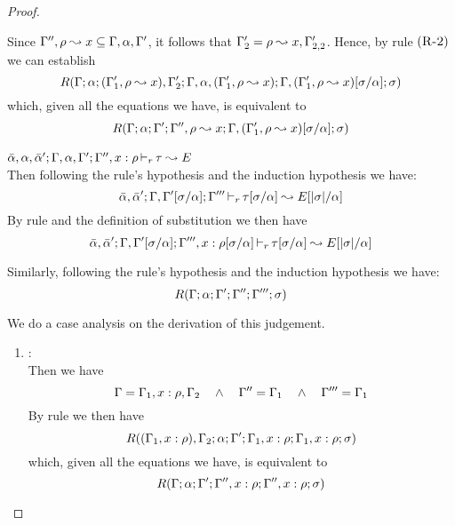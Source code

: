 \begin{proof}
\begin{description}
\begin{enumerate}
  Since $\Gamma'',\rho \leadsto x \subseteq \Gamma,\alpha,\Gamma'$, it follows that $\Gamma_2' = \rho\leadsto x,\Gamma_{2,2}'$.
  Hence, by rule $\mbox{({\tt\sc R-2})}$ we can establish
\begin{equation*}
R(\Gamma;\alpha;(\Gamma_1',\rho\leadsto x),\Gamma_2';\Gamma,\alpha,(\Gamma_1',\rho \leadsto x);\Gamma,(\Gamma_1',\rho\leadsto x)[\sigma/\alpha];\sigma)
\end{equation*}
        which, given all the equations we have, is equivalent to
\begin{equation*}
R(\Gamma;\alpha;\Gamma';\Gamma'',\rho\leadsto x;\Gamma,(\Gamma_1',\rho \leadsto x)[\sigma/\alpha];\sigma)
\end{equation*}
  \end{enumerate}
\item[\fbox{\texttt{(L-Var)}}]\quad$\bar{\alpha},\alpha,\bar{\alpha}';\Gamma,\alpha,\Gamma';\Gamma'', x : \rho  \mathop{\vdash_{r}} \tau \leadsto E$ \ \\
  Then following the rule's hypothesis and the induction hypothesis we have:
\begin{equation*}
  \bar{\alpha},\bar{\alpha}';\Gamma,\Gamma'[\sigma/\alpha];\Gamma''' \mathop{\vdash_{r}} \tau[\sigma/\alpha] \leadsto E[|\sigma|/\alpha]
\end{equation*}
  By rule  and the definition of substitution we then have
\begin{equation*}
  \bar{\alpha},\bar{\alpha}';\Gamma,\Gamma'[\sigma/\alpha];\Gamma''',x:\rho[\sigma/\alpha] \mathop{\vdash_{r}} \tau[\sigma/\alpha] \leadsto E[|\sigma|/\alpha]
\end{equation*}

  Similarly, following the rule's hypothesis and the induction hypothesis we have:
\begin{equation*}
  R(\Gamma;\alpha;\Gamma';\Gamma'';\Gamma''';\sigma)
\end{equation*}

  We do a case analysis on the derivation of this judgement.
  \begin{enumerate}
  \item {}: \\ Then we have
\begin{equation*}
  \Gamma = \Gamma_1,x:\rho,\Gamma_2  \quad\wedge\quad \Gamma'' = \Gamma_1 \quad\wedge\quad \Gamma''' = \Gamma_1
\end{equation*}
       By rule  we then have
\begin{equation*}
R((\Gamma_1,x:\rho),\Gamma_2;\alpha;\Gamma';\Gamma_1,x:\rho;\Gamma_1,x:\rho;\sigma)
\end{equation*}
        which, given all the equations we have, is equivalent to
\begin{equation*}
R(\Gamma;\alpha;\Gamma';\Gamma'',x:\rho;\Gamma'',x:\rho;\sigma)
\end{equation*}


\end{enumerate}
\end{description}
\end{proof}
